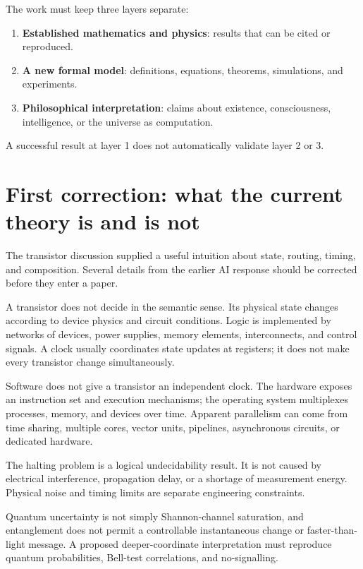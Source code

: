 \documentclass[11pt]{article}
\theoremstyle{definition}
\theoremstyle{plain}
\theoremstyle{remark}
\begin{document}
The work must keep three layers separate:
\begin{enumerate}
  \item \textbf{Established mathematics and physics}: results that can be cited or reproduced.
  \item \textbf{A new formal model}: definitions, equations, theorems, simulations, and experiments.
  \item \textbf{Philosophical interpretation}: claims about existence, consciousness, intelligence, or the universe as computation.
\end{enumerate}

A successful result at layer 1 does not automatically validate layer 2 or 3.

\section{First correction: what the current theory is and is not}

The transistor discussion supplied a useful intuition about state, routing, timing, and composition. Several details from the earlier AI response should be corrected before they enter a paper.

A transistor does not decide in the semantic sense. Its physical state changes according to device physics and circuit conditions. Logic is implemented by networks of devices, power supplies, memory elements, interconnects, and control signals. A clock usually coordinates state updates at registers; it does not make every transistor change simultaneously.

Software does not give a transistor an independent clock. The hardware exposes an instruction set and execution mechanisms; the operating system multiplexes processes, memory, and devices over time. Apparent parallelism can come from time sharing, multiple cores, vector units, pipelines, asynchronous circuits, or dedicated hardware.

The halting problem is a logical undecidability result. It is not caused by electrical interference, propagation delay, or a shortage of measurement energy. Physical noise and timing limits are separate engineering constraints.

Quantum uncertainty is not simply Shannon-channel saturation, and entanglement does not permit a controllable instantaneous change or faster-than-light message. A proposed deeper-coordinate interpretation must reproduce quantum probabilities, Bell-test correlations, and no-signalling.
\end{document}
